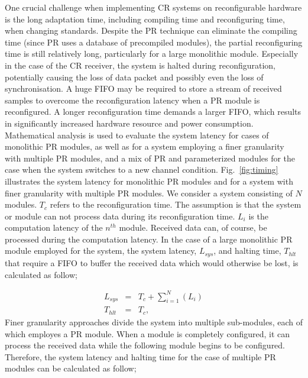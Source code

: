 One crucial challenge when implementing CR systems on reconfigurable hardware is the long adaptation time, including compiling time and reconfiguring time, when changing standards. 
Despite the PR technique can eliminate the compiling time (since PR uses a database of precompiled modules), the partial reconfiguring time is still relatively long, particularly for a large monolithic module. Especially in the case of the CR receiver, the system is halted during reconfiguration, potentially causing the loss of data packet and possibly even the loss of synchronisation. A huge FIFO may be required to store a stream of received samples to overcome the reconfiguration latency when a PR module is reconfigured. A longer reconfiguration time demands a larger FIFO, which results in significantly increased hardware resource and power consumption. Mathematical analysis is used to evaluate the system latency for cases of monolithic PR modules, as well as for a system employing a finer granularity with multiple PR modules, and a mix of PR and parameterized modules for the case when the system switches to a new channel condition. Fig.~\ref{fig:timing} illustrates the system latency for monolithic PR modules and for a system with finer granularity with multiple PR modules. We consider a system consisting of $N$ modules. $T_{c}$ refers to the reconfiguration time. The assumption is that the system or module can not process data during its reconfiguration time. $L_{i}$ is the computation latency of  the $n^{th}$ module. Received data can, of course, be processed during the computation latency. In the case of a large monolithic PR module employed for the system, the system latency, $L_{sys}$, and halting time, $T_{hlt}$ that require a FIFO to buffer the received data which would otherwise be lost, is calculated as follow;

\begin{eqnarray}
\label{Mono}
L_{sys} &=& T_{c} + \sum_{i = 1}^{N}    (L_{i}) \nonumber \\
T_{hlt} &=& T_{c},
\end{eqnarray}
Finer granularity approaches divide the system into multiple sub-modules, each of which employes a PR module. When a module is completely configured, it can process the received data while the following module begins to be configured. Therefore, the system latency and halting time for the case of multiple PR modules can be calculated as follow;

